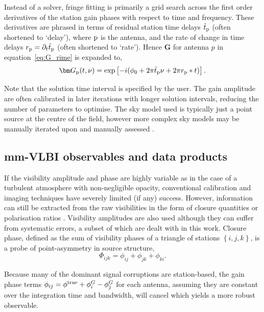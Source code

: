 Instead of a solver, fringe fitting is primarily a grid search across the first order derivatives of the station gain phases with respect to time and frequency. These derivatives are phrased in terms of residual station time delays $\tilde{t}_{\rm p}$ (often shortened to `delay'), where ${\rm p}$ is the antenna, and the rate of change in time delays $r_{\rm p} = \partial_t \tilde{t}_{\rm p}$  (often shortened to `rate'). Hence $\bm G$ for antenna $p$ in equation~\ref{eq:G_rime} is expanded to,
\begin{equation}
\bm G_{\rm p}(t,\nu) = \exp\left[-i(\phi_0 +2\pi\tilde{t}_{\rm p}\nu + 2\pi r_{\rm p}*t)\right].
\end{equation}


Note that the solution time interval is specified by the user. The gain amplitude are often calibrated in later iterations with longer solution intervals, reducing the number of parameters to optimise. The sky model used is typically just a point source at the centre of the field, however more complex sky models may be manually iterated upon and manually assessed \citep{Walker_1999}. 

\subsection{mm-VLBI observables and data products}\label{data_products}

If the visibility amplitude and phase are highly variable as in the case of a turbulent atmosphere with non-negligible opacity,  conventional calibration and imaging techniques have severely limited (if any) success. However, information can still be extracted from the raw visibilities in the form of closure quantities \citep{Monnier_2007} or polarisation ratios \citep{Fish_2009b, Johnson_2015b}. Visibility amplitudes are also used although they can suffer from systematic errors, a subset of which are dealt with in this work. Closure phase, defined as the sum of visibility phases of a triangle of stations $\left\{i,j,k\right\}$, is a probe of point-asymmetry in source structure,
\begin{equation}
\Phi_{ijk} = \phi_{ij}+\phi_{jk}+\phi_{ki}.
\end{equation}

\noindent Because many of the dominant signal corruptions are station-based, the gain phase terms $\phi_{ij}=\phi^{\rm true}+ \phi^G_i -\phi^G_j$ for each antenna, assuming they are constant over the integration time and bandwidth, will cancel which yields a more robust observable.  

